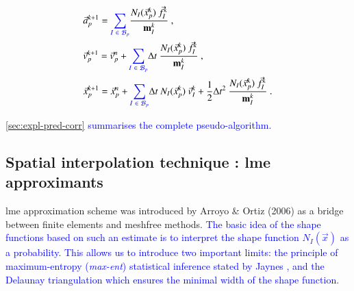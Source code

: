 \documentclass[preprint,12pt,a4paper]{elsarticle}
\newcommand{\tens}[1]{
  \ensuremath{\mathbf{{#1}}}
}
\begin{document}
\begin{align}
  \label{eq:Update-lagrangian-pce}
        &\vec{a}_p^{k+1} = \textcolor{blue}{\sum_{I\ \in\ \mathcal{B}_p}}
          \frac{N_{I}(\vec{x}_p^k)\ \vec{f}_{I}^{k}}{\tens{m}_I^k}\ ,\\
      &\vec{v}_p^{k+1} = \vec{v}_p^n + \textcolor{blue}{\sum_{I\ \in\ \mathcal{B}_p}} \Delta t\
        \frac{N_{I}(\vec{x}_p^k)\
        \vec{f}_{I}^{k}}{\tens{m}_I^k}\ ,\\
      &\vec{x}_p^{k+1} = \vec{x}_p^n +  \textcolor{blue}{\sum_{I\ \in\ \mathcal{B}_p}} \Delta t\
         N_{I}(\vec{x}_p^k)\ \vec{v}_{I}^{k} +
        \frac{1}{2}\Delta t^2\ \frac{N_{I}(\vec{x}_p^k)\
        \vec{f}_{I}^{k}}{\tens{m}_I^k}\ .
\end{align}

\textcolor{blue}{\ref{sec:expl-pred-corr} summarises the complete pseudo-algorithm.}

\subsection{Spatial interpolation technique : \acrlong{lme} approximants}
\label{sec:2.2}
\acrfull{lme} approximation scheme was introduced by Arroyo \& Ortiz
(2006)\cite{Arroyo2006} as a bridge between finite elements and
meshfree methods. \textcolor{blue}{The basic idea of the shape functions based on such an estimate is to interpret the shape function $N_I(\vec{x})$ as a probability. This allows us to introduce two important limits: the principle of maximum-entropy (\textit{max-ent}) statistical
inference stated by Jaynes \cite{Jaynes1957}, and the Delaunay triangulation
which ensures the minimal width of the shape function.}
\end{document}
